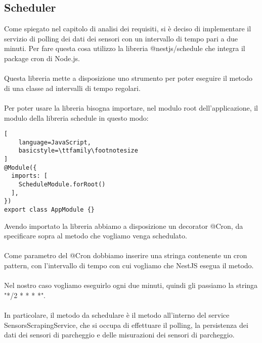 \subsection{Scheduler}
Come spiegato nel capitolo di analisi dei requisiti, si è deciso di implementare il servizio di polling dei dati
dei sensori con un intervallo di tempo pari a due minuti. Per fare questa cosa utilizzo 
la libreria @nestjs/schedule che integra il package cron di Node.js.
\\\\
Questa libreria mette a disposizione uno strumento per poter eseguire il metodo
di una classe ad intervalli di tempo regolari.
\\\\
Per poter usare la libreria bisogna importare, nel modulo root dell'applicazione, il modulo della libreria schedule in questo modo:
\begin{lstlisting}[
    language=JavaScript,
    basicstyle=\ttfamily\footnotesize
]
@Module({
  imports: [
    ScheduleModule.forRoot()
  ],
})
export class AppModule {}
\end{lstlisting}
\leavevmode\newline
Avendo importato la libreria abbiamo a disposizione un decorator @Cron, da specificare sopra al metodo che vogliamo venga 
schedulato. 
\\\\
Come parametro del @Cron dobbiamo inserire una stringa contenente un cron pattern, con
l'intervallo di tempo con cui vogliamo che NestJS esegua il metodo.
\\\\
Nel nostro caso vogliamo eseguirlo ogni due minuti, quindi gli passiamo la stringa "*/2 * * * *".
\\\\
In particolare, il metodo da schedulare è il metodo all'interno del service SensorsScrapingService, che si occupa
di effettuare il polling, la persistenza dei dati dei sensori di parcheggio e delle misurazioni dei sensori di parcheggio.

